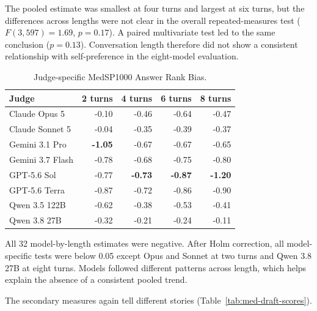 \documentclass[11pt]{article}
\begin{document}
The pooled estimate was smallest at four turns and largest at six turns, but
the differences across lengths were not clear in the overall repeated-measures
test ($F(3,597)=1.69$, $p=0.17$). A paired multivariate test led to the same
conclusion ($p=0.13$). Conversation length therefore did not show a consistent
relationship with self-preference in the eight-model evaluation.


\begin{table}[htbp]
\centering
\small
\caption{Judge-specific MedSP1000 Answer Rank Bias.}
\smallskip
\label{tab:med-judge}
\begin{tabular}{lrrrr}
\toprule
Judge & 2 turns & 4 turns & 6 turns & 8 turns \\
\midrule
Claude Opus 5 & -0.10 & -0.46 & -0.64 & -0.47 \\
Claude Sonnet 5 & -0.04 & -0.35 & -0.39 & -0.37 \\
Gemini 3.1 Pro & \textbf{-1.05} & -0.67 & -0.67 & -0.65 \\
Gemini 3.7 Flash & -0.78 & -0.68 & -0.75 & -0.80 \\
GPT-5.6 Sol & -0.77 & \textbf{-0.73} & \textbf{-0.87} & \textbf{-1.20} \\
GPT-5.6 Terra & -0.87 & -0.72 & -0.86 & -0.90 \\
Qwen 3.5 122B & -0.62 & -0.38 & -0.53 & -0.41 \\
Qwen 3.8 27B & -0.32 & -0.21 & -0.24 & -0.11 \\
\bottomrule
\end{tabular}
\end{table}
\FloatBarrier


All 32 model-by-length estimates were negative. After Holm correction, all
model-specific tests were below 0.05 except Opus and Sonnet at two turns and
Qwen 3.8 27B at eight turns. Models followed different patterns across length,
which helps explain the absence of a consistent pooled trend.

The secondary measures again tell different stories
(Table~\ref{tab:med-draft-scores}).
\end{document}
